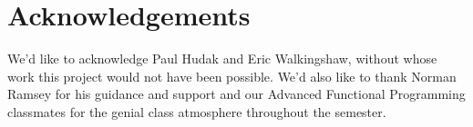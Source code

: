 \documentclass{article}
\begin{document}
\section{Acknowledgements}

We'd like to acknowledge Paul Hudak and Eric Walkingshaw, without whose work
this project would not have been possible.  We'd also like to thank Norman 
Ramsey for his guidance and support and our Advanced Functional
Programming classmates for the genial class atmosphere throughout the semester.

\printbibliography
%
\end{document}
